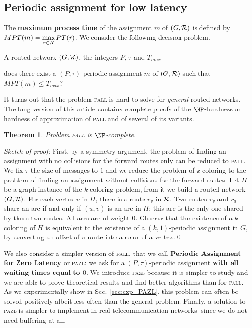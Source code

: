\documentclass[10pt, conference, letterpaper]{IEEEtran}
\newtheorem{theorem}{Theorem}
\newcommand{\todo}[1]{{\color{red} TODO: {#1}}}
\newcommand\pazl{\textsc{pazl}\xspace}
\newcommand\pall{\textsc{pall}\xspace}
\begin{document}
    
      \subsection{Periodic assignment for low latency}
      
      
    The {\bf maximum process time} of the assignment $m$ of $(G,{\cal R})$ is defined by $MPT(m)=\max\limits_{r \in {\cal R}} PT(r)$. We consider the following decision problem.

      \noindent {\bf Periodic Assignment for Low Latency (\pall)} 

        A routed network $(G,{\cal R})$, the integers $P$, $\tau$ and $T_{max}$.

       does there exist a $(P,\tau)$-periodic assignment $m$ of $(G,{\cal R})$ such that $MPT(m) \leq T_{max}$?

      It turns out that the problem \pall is hard to solve for \emph{general} routed networks. The long version of this article contains complete proofs of the $\NP$-hardness or hardness of approximation of \pall and of several of its variants.

 \begin{theorem}
Problem \pall is $\NP$-complete.
\end{theorem}

\noindent \emph{Sketch of proof:}
 First, by a symmetry argument, the problem of finding an assignment with no collisions for the forward routes only
 can be reduced to \pall.
 We fix $\tau$ the size of messages to $1$ and we reduce the problem of $k$-coloring to the 
 problem of finding an assignment without collisions for the forward routes.
 Let $H$ be a graph instance of the $k$-coloring problem, from it we build a routed network $(G,{\cal R})$. 
 For each vertex $v$ in $H$, there is a route $r_v$ in ${\cal R}$. Two routes $r_v$ and $r_u$ share an arc if and only if $(u,v)$ is an arc in $H$; this arc is the only one shared by these two routes. All arcs are of weight $0$. 
 Observe that the existence of a $k$-coloring of $H$ is equivalent to the existence of a $(k,1)$-periodic assignment in $G$, 
 by converting an offset of a route into a color of a vertex.\qed
     
       We also consider a simpler version of \pall, that we call {\bf Periodic Assignment for Zero Latency} or \pazl: we ask for a $(P,\tau)$-periodic assignment {\bf with all waiting times equal to $0$}. We introduce \pazl because it is simpler to study and we are able to prove theoretical results and find better algorithms than for \pall. As we  experimentally show in Sec.~\ref{sec:exp_PAZL}, this problem can often be solved positively albeit less often than the general problem. Finally, a solution to \pazl is simpler to implement in real telecommunication networks, since we do not need buffering at all.    
       
\end{document}
